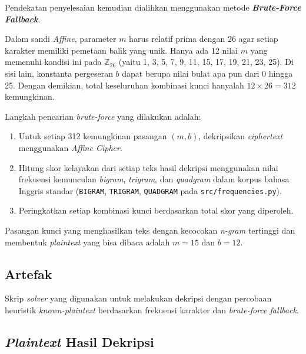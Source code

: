 Pendekatan penyelesaian kemudian dialihkan menggunakan metode \textbf{\textit{Brute-Force Fallback}}. 

Dalam sandi \textit{Affine}, parameter $m$ harus relatif prima dengan 26 agar setiap karakter memiliki pemetaan balik yang unik. Hanya ada 12 nilai $m$ yang memenuhi kondisi ini pada $\mathbb{Z}_{26}$ (yaitu 1, 3, 5, 7, 9, 11, 15, 17, 19, 21, 23, 25). Di sisi lain, konstanta pergeseran $b$ dapat berupa nilai bulat apa pun dari 0 hingga 25. Dengan demikian, total keseluruhan kombinasi kunci hanyalah $12 \times 26 = 312$ kemungkinan.

Langkah pencarian \textit{brute-force} yang dilakukan adalah:
\begin{enumerate}
  \item Untuk setiap 312 kemungkinan pasangan $(m, b)$, dekripsikan \textit{ciphertext} menggunakan \textit{Affine Cipher}.
  \item Hitung skor kelayakan dari setiap teks hasil dekripsi menggunakan nilai frekuensi kemunculan \textit{bigram}, \textit{trigram}, dan \textit{quadgram} dalam korpus bahasa Inggris standar (\texttt{BIGRAM}, \texttt{TRIGRAM}, \texttt{QUADGRAM} pada \texttt{src/frequencies.py}).
  \item Peringkatkan setiap kombinasi kunci berdasarkan total skor yang diperoleh.
\end{enumerate}

Pasangan kunci yang menghasilkan teks dengan kecocokan \textit{n-gram} tertinggi dan membentuk \textit{plaintext} yang bisa dibaca adalah $m = 15$ dan $b = 12$.

\subsection*{Artefak}

Skrip \textit{solver} yang digunakan untuk melakukan dekripsi dengan percobaan heuristik \textit{known-plaintext} berdasarkan frekuensi karakter dan \textit{brute-force fallback}.



\subsection*{\textit{Plaintext} Hasil Dekripsi}


